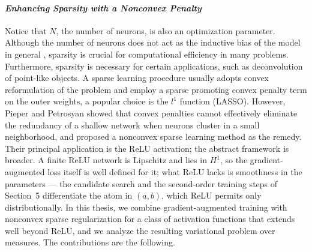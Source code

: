 \documentclass[11pt]{amsart}
\theoremstyle{definition}
\theoremstyle{remark}
\begin{document}
\paragraph{\emph{Enhancing Sparsity with a Nonconvex Penalty}}
Notice that $N$, the number of neurons, is also an optimization parameter. 
Although the number of neurons does not act as the inductive bias of the model in general \cite{neyshabur2014search}, sparsity is crucial for computational efficiency in many problems. 
Furthermore, sparsity is necessary for certain applications, such as deconvolution of point-like objects. 
A sparse learning procedure usually adopts convex reformulation of the problem and employ a sparse promoting convex penalty term on the outer weights, a popular choice is the $l^1$ function (LASSO). 
However, Pieper and Petrosyan \cite{pieper2022nonconvex} showed that convex penalties cannot effectively eliminate the redundancy of a shallow network when neurons cluster in a small neighborhood, and proposed a nonconvex sparse learning method as the remedy. Their principal application is the ReLU activation; the abstract framework is broader.
A finite ReLU network is Lipschitz and lies in $H^1$, so the gradient-augmented loss itself is well defined for it; what ReLU lacks is smoothness in the parameters --- the candidate search and the second-order training steps of Section~5 differentiate the atom in $(a, b)$, which ReLU permits only distributionally.
In this thesis, we combine gradient-augmented training with nonconvex sparse regularization for a class of activation functions that extends well beyond ReLU, and we analyze the resulting variational problem over measures. The contributions are the following.
\end{document}
